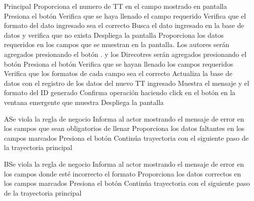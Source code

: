 
\begin{UCtrayectoria}{Principal}
		\UCpaso[\UCactor] Proporciona el numero de TT en el campo mostrado en pantalla 
		\UCpaso[\UCactor] Presiona el botón  
		\UCpaso[\UCsist] Verifica que se haya llenado el campo requerido 
		\UCpaso[\UCsist] Verifica que el formato del dato ingresado sea el correcto 
		\UCpaso[\UCsist] Busca el dato ingresado en la base de datos  y verifica que no exista 
		\UCpaso[\UCsist] Despliega la pantalla 
		\UCpaso[\UCactor] Proporciona los datos requeridos en los campos que se muestran en la pantalla. Los autores serán agregados presionando el botón . y los Direcotres serán agregados presionando el botón 
		\UCpaso[\UCactor] Presiona el botón  
		\UCpaso[\UCsist] Verifica que se hayan llenado los campos requeridos 
		\UCpaso[\UCsist] Verifica que los formatos de cada campo sea el correcto 
		\UCpaso[\UCsist] Actualiza la base de datos con el registro de los datos del nuevo TT ingresado
		\UCpaso[\UCsist] Muestra el mensaje  y el formato del ID generado
		\UCpaso[\UCactor] Confirma operación haciendo click en el botón  en la ventana emergente que muestra
		\UCpaso[\UCsist] Despliega la pantalla 
\end{UCtrayectoria}



\begin{UCtrayectoriaA}{A}{Se viola la regla de negocio }	
			\UCpaso[\UCsist] Informa al actor mostrando el mensaje de error  en los campos que sean obligatorios de llenar
			\UCpaso[\UCactor] Proporciona los datos faltantes en los campos marcados 
			\UCpaso[\UCactor] Presiona el botón   
			\UCpaso[\UCsist] Continúa trayectoria con el siguiente paso de la trayectoria principal 
\end{UCtrayectoriaA}


\begin{UCtrayectoriaA}{B}{Se viola la regla de negocio }	
			\UCpaso[\UCsist] Informa al actor mostrando el mensaje de error  en los campos donde esté incorrecto el formato
			\UCpaso[\UCactor] Proporciona los datos correctos en los campos marcados 
			\UCpaso[\UCactor] Presiona el botón     
			\UCpaso[\UCsist] Continúa trayectoria con el siguiente paso de la trayectoria principal 
\end{UCtrayectoriaA}

